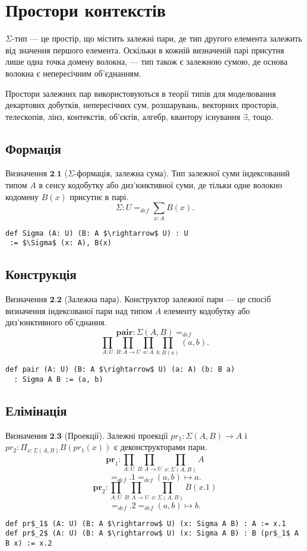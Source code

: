 \documentclass{article}
\theoremstyle{definition}
\begin{document}
\newpage
\section{Простори контекстів}

$\Sigma$-тип --- це простір, що містить залежні пари, де тип другого
елемента залежить від значення першого елемента. Оскільки в кожній
визначеній парі присутня лише одна точка домену волокна, — тип також
є залежною сумою, де основа волокна є непересічним об'єднанням.

Простори залежних пар використовуються в теорії типів для моделювання
декартових добутків, непересічних сум, розшарувань, векторних просторів,
телескопів, лінз, контекстів, об'єктів, алгебр, квантору існування $\exists$, тощо.

\subsection{Формація}

$\textbf{Визначення\ 2.1}$ ($\Sigma$-формація, залежна сума). Тип залежної суми
індексований типом  $A$ в сенсу кодобутку або диз'юнктивної суми, де тільки одне
волокно кодомену $B(x)$ присутнє в парі.
$$
     \Sigma : U =_{def} \sum_{x:A} B(x).
$$
\begin{lstlisting}[mathescape=true]
def Sigma (A: U) (B: A $\rightarrow$ U) : U
 := $\Sigma$ (x: A), B(x)
\end{lstlisting}

\subsection{Конструкція}

$\textbf{Визначення\ 2.2}$ (Залежна пара). Конструктор залежної пари —
це спосіб визначення індексованої пари над типом $A$ елементу кодобутку
або диз'юнктивного об'єднання.
$$
      \mathbf{pair} : \Sigma(A,B) =_{def}
$$
$$
      \prod_{A:U}\prod_{B:A \rightarrow U}\prod_{a:A}\prod_{b:B(a)} (a,b).
$$
\begin{lstlisting}[mathescape=true]
def pair (A: U) (B: A $\rightarrow$ U) (a: A) (b: B a)
  : Sigma A B := (a, b)
\end{lstlisting}

\newpage

\subsection{Елімінація}

$\textbf{Визначення\ 2.3}$ (Проекції). Залежні проекції
$pr_{1}: \Sigma(A,B) \rightarrow A$ і
$pr_{2}: \Pi_{x: \Sigma(A,B)} B(pr_{1}(x))$ є деконструкторами пари.
$$
    \mathbf{pr}_1 : \prod_{A:U} \prod_{B:A \rightarrow U} \prod_{x: \Sigma(A,B)} A
$$
$$
    =_{def} .1 =_{def} (a,b) \mapsto a.
$$
$$
    \mathbf{pr}_2 : \prod_{A:U} \prod_{B:A \rightarrow U} \prod_{x: \Sigma(A,B)} B(x.1)
$$
$$
    =_{def} .2 =_{def} (a,b) \mapsto b.
$$
\begin{lstlisting}[mathescape=true]
def pr$_1$ (A: U) (B: A $\rightarrow$ U) (x: Sigma A B) : A := x.1
def pr$_2$ (A: U) (B: A $\rightarrow$ U) (x: Sigma A B) : B (pr$_1$ A B x) := x.2
\end{lstlisting}
\end{document}

